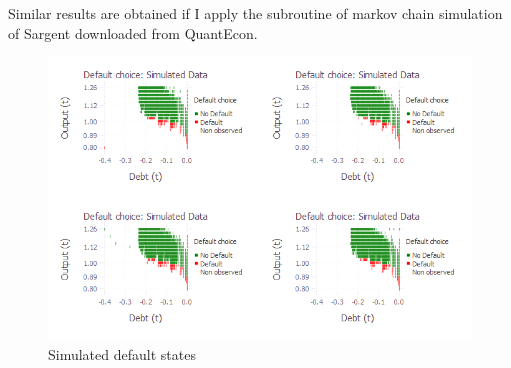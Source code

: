 \documentclass[12pt, a4paper]{article}
\begin{document}
Similar results are obtained if I apply the subroutine of markov chain simulation of Sargent downloaded from QuantEcon.
\begin{figure}[!hbt]
	\centering
	\caption{Simulated default states}
	\includegraphics[scale=0.7]{../Plots/heats(Quant).png}
	\begin{minipage}{0.65\textwidth}
		{\scriptsize\par}
	\end{minipage}
\end{figure}
\end{document}
